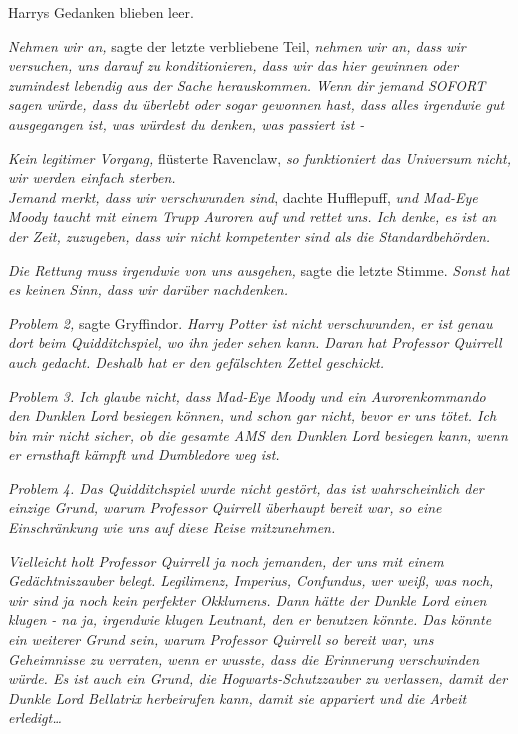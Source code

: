 {Harrys Gedanken blieben leer.

\emph{Nehmen wir an,} sagte der letzte verbliebene Teil, \emph{nehmen wir an, dass wir versuchen, uns darauf zu konditionieren, dass wir das hier gewinnen oder zumindest lebendig aus der Sache herauskommen. Wenn dir jemand SOFORT sagen würde, dass du überlebt oder sogar gewonnen hast, dass alles irgendwie gut ausgegangen ist, was würdest du denken, was passiert ist -}

\emph{Kein legitimer Vorgang,} flüsterte Ravenclaw, \emph{so funktioniert das Universum nicht, wir werden einfach sterben.}\\ \emph{\hfill\break Jemand merkt, dass wir verschwunden sind}, dachte Hufflepuff, \emph{und Mad-Eye}\\ \emph{Moody taucht mit einem Trupp Auroren auf und rettet uns. Ich denke, es ist an der Zeit, zuzugeben, dass wir nicht kompetenter sind als die Standardbehörden.}

\emph{Die Rettung muss irgendwie von uns ausgehen,} sagte die letzte Stimme. \emph{Sonst hat es keinen Sinn, dass wir darüber nachdenken.}

\emph{Problem 2,} sagte Gryffindor. \emph{Harry Potter ist nicht verschwunden, er ist genau dort beim Quidditchspiel, wo ihn jeder sehen kann. Daran hat Professor Quirrell auch gedacht. Deshalb hat er den gefälschten Zettel geschickt.}

\emph{Problem 3. Ich glaube nicht, dass Mad-Eye Moody und ein Aurorenkommando den Dunklen Lord besiegen können, und schon gar nicht, bevor er uns tötet. Ich bin mir nicht sicher, ob die gesamte AMS den Dunklen Lord besiegen kann, wenn er ernsthaft kämpft und Dumbledore weg ist.}

\emph{Problem 4. Das Quidditchspiel wurde nicht gestört, das ist wahrscheinlich der einzige Grund, warum Professor Quirrell überhaupt bereit war, so eine Einschränkung wie uns auf diese Reise mitzunehmen.}

\emph{Vielleicht holt Professor Quirrell ja noch jemanden, der uns mit einem Gedächtniszauber belegt. Legilimenz, Imperius, Confundus, wer weiß, was noch, wir sind ja noch kein perfekter Okklumens. Dann hätte der Dunkle Lord einen klugen - na ja, irgendwie klugen Leutnant, den er benutzen könnte. Das könnte ein weiterer Grund sein, warum Professor Quirrell so bereit war, uns Geheimnisse zu verraten, wenn er wusste, dass die Erinnerung verschwinden würde. Es ist auch ein Grund, die Hogwarts-Schutzzauber zu verlassen, damit der Dunkle Lord Bellatrix herbeirufen kann, damit sie appariert und die Arbeit erledigt…}

}
